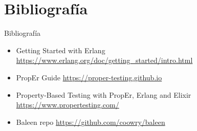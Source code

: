 \documentclass{beamer}
\begin{document}
  \section{Bibliografía}
    \begin{frame}{Bibliografía}
      \begin{itemize}
        \item Getting Started with Erlang \url{https://www.erlang.org/doc/getting_started/intro.html}
        \item PropEr Guide \url{https://proper-testing.github.io}
        \item Property-Based Testing with PropEr, Erlang and Elixir \url{https://www.propertesting.com/}
        \item Baleen repo \url{https://github.com/coowry/baleen}
      \end{itemize}
    \end{frame}
\end{document}
